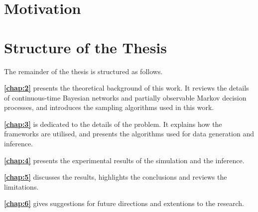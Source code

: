 \section{Motivation}




\section{Structure of the Thesis}
The remainder of the thesis is structured as follows.

\textbf{\cref{chap:2}} presents the theoretical background of this work. It reviews the details of continuous-time Bayesian networks and partially observable Markov decision processes, and introduces the sampling algorithms used in this work.

\textbf{\cref{chap:3}} is dedicated to the details of the problem. It explains how the frameworks are utilised, and presents the algorithms used for data generation and inference.

\textbf{\cref{chap:4}} presents the experimental results of the simulation and the inference.

\textbf{\cref{chap:5}} discusses the results, highlights the conclusions and reviews the limitations.

\textbf{\cref{chap:6}} gives suggestions for future directions and extentions to the research.